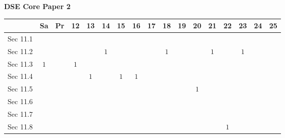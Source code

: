 \documentclass[12pt, a4paper]{article}
\begin{document}
\begin{absolutelynopagebreak}
\begin{center}
\textbf{DSE Core Paper 2}
\end{center}
\begin{center}
\begin{tabular}{|l|c|c|c|c|c|c|c|c|c|c|c|c|c|c|c|c|}
\hline
        & Sa & Pr & 12 & 13 & 14 & 15 & 16 & 17 & 18 & 19 & 20 & 21 & 22 & 23 & 24 & 25 \\\hline\hline
Sec 11.1 &  &  &  &  &  &  &  &  &  &  &  &  &  &  &  &  \\\hline
Sec 11.2 &  &  &  &  &  $1$ &  &  &  &  $1$ &  &  &  $1$ &  &  $1$ &  &  \\\hline
Sec 11.3 &  $1$ &  &  $1$ &  &  &  &  &  &  &  &  &  &  &  &  &  \\\hline
Sec 11.4 &  &  &  &  $1$ &  &  $1$ &  $1$ &  &  &  &  &  &  &  &  &  \\\hline
Sec 11.5 &  &  &  &  &  &  &  &  &  &  &  $1$ &  &  &  &  &  \\\hline
Sec 11.6 &  &  &  &  &  &  &  &  &  &  &  &  &  &  &  &  \\\hline
Sec 11.7 &  &  &  &  &  &  &  &  &  &  &  &  &  &  &  &  \\\hline
Sec 11.8 &  &  &  &  &  &  &  &  &  &  &  &  &  $1$ &  &  &  \\\hline
\end{tabular}
\end{center}
\end{absolutelynopagebreak}
\end{document}
